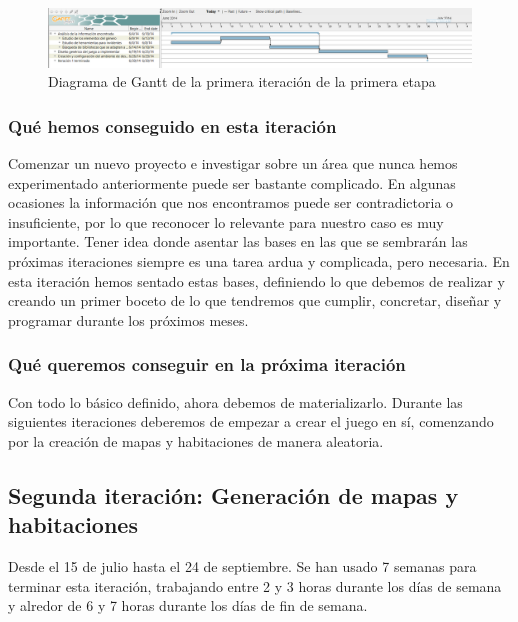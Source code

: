 \begin{figure}
    \includegraphics[width=\textwidth,height=\textheight,keepaspectratio]{./img/sec1it1.png}
  \caption{Diagrama de Gantt de la primera iteración de la primera etapa}
  \label{fig:sec1it1}
\end{figure}

\subsubsection{Qué hemos conseguido en esta iteración}

Comenzar un nuevo proyecto e investigar sobre un área que nunca hemos experimentado anteriormente puede ser bastante complicado. En algunas ocasiones la información que nos encontramos puede ser contradictoria o insuficiente, por lo que reconocer lo relevante para nuestro caso es muy importante. Tener idea donde asentar las bases en las que se sembrarán las próximas iteraciones siempre es una tarea ardua y complicada, pero necesaria. En esta iteración hemos sentado estas bases, definiendo lo que debemos de realizar y creando un primer boceto de lo que tendremos que cumplir, concretar, diseñar y programar durante los próximos meses.

\subsubsection{Qué queremos conseguir en la próxima iteración}

Con todo lo básico definido, ahora debemos de materializarlo. Durante las siguientes iteraciones deberemos de empezar a crear el juego en sí, comenzando por la creación de mapas y habitaciones de manera aleatoria.

\subsection{Segunda iteración: Generación de mapas y habitaciones}

Desde el 15 de julio hasta el 24 de septiembre. Se han usado 7 semanas para terminar esta iteración, trabajando entre 2 y 3 horas durante los días de semana y alredor de 6 y 7 horas durante los días de fin de semana.

